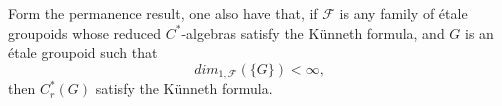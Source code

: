 Form the permanence result, one also have that, if $\mathcal F$ is any family of \'etale groupoids whose reduced $C^*$-algebras satisfy the Künneth formula, and $G$ is an \'etale groupoid such that \[dim_{1, \mathcal F} ( \{G\} ) < \infty, \]
then $C_r^*(G)$ satisfy the Künneth formula.

































